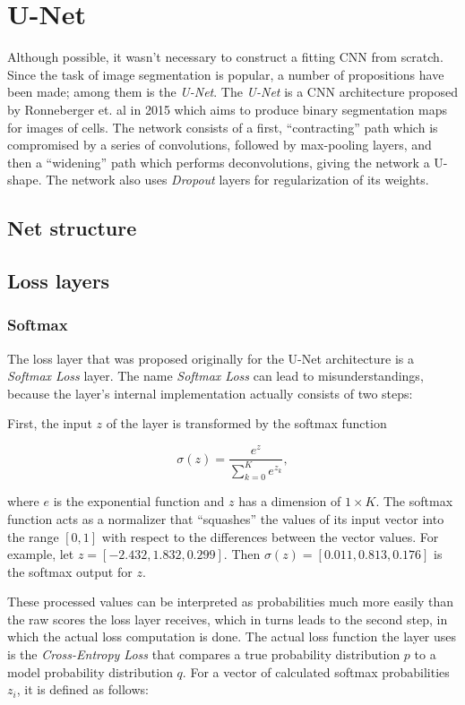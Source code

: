 \chapter {U-Net}
Although possible, it wasn't necessary to construct a fitting CNN from scratch. Since the task of image segmentation is popular, a number of propositions have been made; among them is the \textit{U-Net}. The \textit{U-Net} is a CNN architecture proposed by Ronneberger et. al in 2015\cite{unet} which aims to produce binary segmentation maps for images of cells. The network consists of a first, ``contracting'' path which is compromised by a series of convolutions, followed by max-pooling layers, and then a ``widening'' path which performs deconvolutions, giving the network a U-shape. The network also uses \textit{Dropout} layers\cite{dropout} for regularization of its weights.

	\section {Net structure}

	\section {Loss layers}

		\subsection{Softmax}

The loss layer that was proposed originally for the U-Net architecture is a \textit{Softmax Loss} layer. The name \textit{Softmax Loss} can lead to misunderstandings, because the layer's internal implementation actually consists of two steps:

First, the input $z$ of the layer is transformed by the softmax function

\[\sigma(z) = \frac{e^{z}}{\sum \limits_{k=0}^{K} e^{z_k}},\]

\noindent where $e$ is the exponential function and $z$ has a dimension of $1 \times K$. The softmax function acts as a normalizer that ``squashes'' the values of its input vector into the range $[0, 1]$ with respect to the differences between the vector values. For example, let $z = [-2.432, 1.832, 0.299]$. Then $\sigma(z) = [0.011, 0.813, 0.176]$ is the softmax output for $z$.

These processed values can be interpreted as probabilities much more easily than the raw scores the loss layer receives, which in turns leads to the second step, in which the actual loss computation is done. The actual loss function the layer uses is the \textit{Cross-Entropy Loss} that compares a true probability distribution $p$ to a model probability distribution $q$. For a vector of calculated softmax probabilities $z_i$, it is defined as follows:

